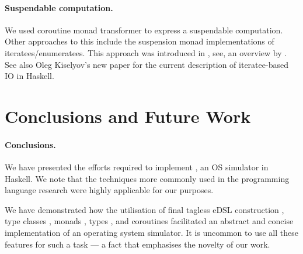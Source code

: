 \paragraph{Suspendable computation.} We used coroutine monad transformer \cite{cmt} to express a suspendable computation.
Other approaches to this include the suspension monad implementations of iteratees/enumeratees. This approach was introduced in \cite{oleg-iteratee}, see, \eg an overview by \citeauthor{lato2010iteratee} \cite{lato2010iteratee}.
See also Oleg Kiselyov's new paper \cite{springerlink:10.1007/978-3-642-29822-6_15} for the current description of iteratee-based IO in Haskell.




\section{Conclusions and Future Work}
\label{sec:concl-future-work}

\paragraph{Conclusions.}
We have presented the efforts required to implement \soosim, an OS simulator in Haskell.
We note that the techniques more commonly used in the programming language research were highly applicable for our purposes.

We have demonstrated how the utilisation of final tagless eDSL construction \cite{final_tagless_embedding,Hofer:2008:PED:1449913.1449935}, type classes \cite{Hall:1996:TCH:227699.227700}, monads \cite{Wadler:1990:CM:91556.91592},  types \cite{Abadi:1991:DTS:103135.103138}, and coroutines \cite{coroutines,cmt} facilitated an abstract and concise implementation of an operating system simulator.
It is uncommon to use all these features for such a task --- a fact that emphasises the novelty of our work.

